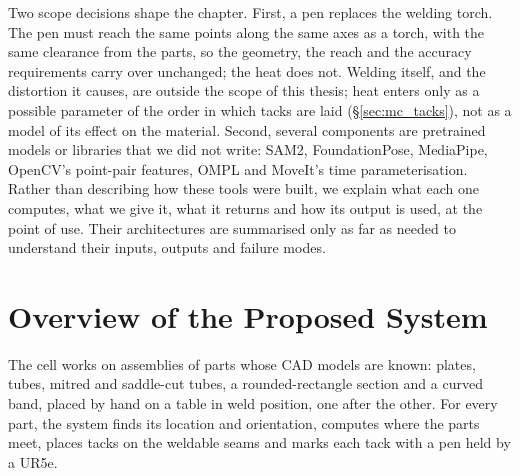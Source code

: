 Two scope decisions shape the chapter. First, a pen replaces the welding torch. The pen must
reach the same points along the same axes as a torch, with the same clearance from the parts,
so the geometry, the reach and the accuracy requirements carry over unchanged; the heat does
not. Welding itself, and the distortion it causes, are outside the scope of this thesis; heat enters
only as a possible parameter of the order in which tacks are laid (\S\ref{sec:mc_tacks}), not as a
model of its effect on the material. Second, several components are pretrained models or libraries that we did not write: SAM2,
FoundationPose, MediaPipe, OpenCV's point-pair features, OMPL and MoveIt's time
parameterisation. Rather than describing how these tools were built, we explain what each one
computes, what we give it, what it returns and how its output is used, at the point of use.
Their architectures are summarised only as far as needed to understand their inputs, outputs
and failure modes.

\section{Overview of the Proposed System}
\label{sec:mc_overview}
The cell works on assemblies of parts whose CAD models are known: plates, tubes, mitred and
saddle-cut tubes, a rounded-rectangle section and a curved band, placed by hand on a table in
weld position, one after the other. For every part, the system finds its location and
orientation, computes where the parts meet, places tacks on the weldable seams and marks each
tack with a pen held by a UR5e.

